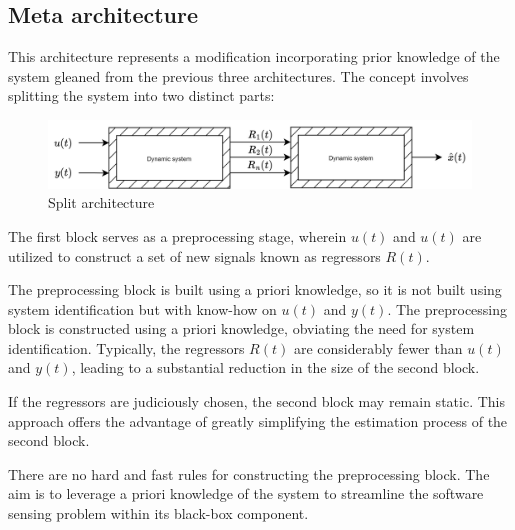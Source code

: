 \subsection{Meta architecture}
This architecture represents a modification incorporating prior knowledge of the system gleaned from the previous three architectures.
The concept involves splitting the system into two distinct parts:
\begin{figure}[H]
    \centering
    \includegraphics[width=0.75\linewidth]{images/reg.png}
    \caption{Split architecture}
\end{figure}
The first block serves as a preprocessing stage, wherein $u(t)$ and $u(t)$ are utilized to construct a set of new signals known as regressors $R(t)$. 

The preprocessing block is built using a priori knowledge, so it is not built using system identification but with know-how on $u(t)$ and $y(t)$. 
The preprocessing block is constructed using a priori knowledge, obviating the need for system identification. 
Typically, the regressors $R(t)$ are considerably fewer than $u(t)$ and $y(t)$, leading to a substantial reduction in the size of the second block.

If the regressors are judiciously chosen, the second block may remain static. 
This approach offers the advantage of greatly simplifying the estimation process of the second block.

There are no hard and fast rules for constructing the preprocessing block. 
The aim is to leverage a priori knowledge of the system to streamline the software sensing problem within its black-box component.